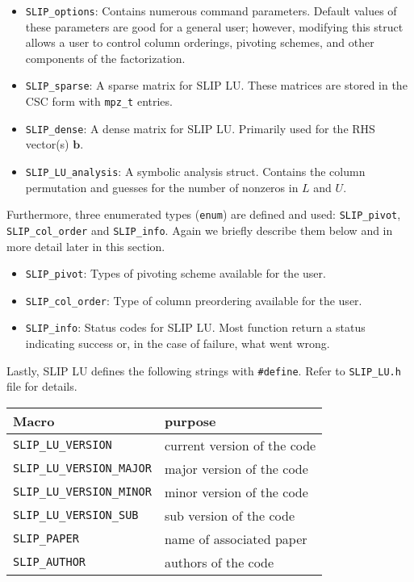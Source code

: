 \documentclass[12pt]{article}
\theoremstyle{definition}
\begin{document}
\begin{itemize}
    \item \verb|SLIP_options|: Contains numerous command parameters. Default
    values of these parameters are good for a general user; however, modifying
    this struct allows a user to control column orderings, pivoting schemes,
    and other components of the factorization.

    \item \verb|SLIP_sparse|: A sparse matrix for SLIP LU. These matrices are
    stored in the CSC form with \verb|mpz_t| entries.

    \item \verb|SLIP_dense|: A dense matrix for SLIP LU. Primarily used for the
    RHS vector(s) $\mathbf{b}$.

    \item \verb|SLIP_LU_analysis|: A symbolic analysis struct. Contains the
    column permutation and guesses for the number of nonzeros in $L$ and $U$.
\end{itemize}

Furthermore, three enumerated types (\verb|enum|) are defined and used:
\verb|SLIP_pivot|, \verb|SLIP_col_order| and \verb|SLIP_info|. Again we briefly
describe them below and in more detail later in this section.

\begin{itemize}
    \item \verb|SLIP_pivot|: Types of pivoting scheme available for the user.
    \item \verb|SLIP_col_order|: Type of column preordering available for the
    user.
    \item \verb|SLIP_info|: Status codes for SLIP LU. Most function return
    a status indicating success or, in the case of failure, what went wrong.
\end{itemize}

Lastly, SLIP LU defines the following strings with \verb|#define|. Refer to
\verb|SLIP_LU.h| file for details.

\begin{center}
\begin{tabular}{ll}
\hline
Macro & purpose \\
\hline
\verb|SLIP_LU_VERSION|       &  current version of the code\\
\verb|SLIP_LU_VERSION_MAJOR| &  major version of the code\\
\verb|SLIP_LU_VERSION_MINOR| & minor version of the code   \\
\verb|SLIP_LU_VERSION_SUB|   &  sub version of the code\\
\hline
\verb|SLIP_PAPER|            & name of associated paper \\
\hline
\verb|SLIP_AUTHOR|           & authors of the code \\
\hline
\end{tabular}
\end{center}
\end{document}
